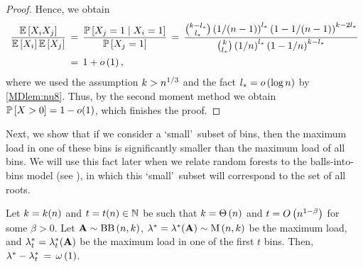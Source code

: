 \begin{proof}
Hence, we obtain
\begin{align*}
	\frac{\mathbb{E}\left[X_i X_j\right]}{\mathbb{E}\left[X_i\right]\mathbb{E}\left[X_j\right]}&\hspace{0.06cm}=\hspace{0.06cm}\frac{\mathbb{P}\left[X_j=1 \;\middle|\; X_i=1\right]}{\mathbb{P}\left[X_j=1\right]}\hspace{0.06cm}=\hspace{0.06cm}\frac{\binom{k-l_\ast}{l_\ast}\left(1/(n-1)\right)^{l_\ast}\left(1-1/(n-1)\right)^{k-2l_\ast}}{\binom{k}{l_\ast}\left(1/n\right)^{l_\ast}\left(1-1/n\right)^{k-l_\ast}} 
	\\
	&\hspace{0.06cm}=\hspace{0.06cm}1+o\left(1\right),
\end{align*}
where we used the assumption $k>n^{1/3}$ and the fact $l_\ast=o\left(\log n\right)$ by \ref{MDlem:nu8}. Thus, by the second moment method we obtain $\mathbb{P}\left[X>0\right]=1-o(1)$, which finishes the proof.
\end{proof}

Next, we show that if we consider a \lq small\rq\ subset of bins, then the maximum load in one of these bins is significantly smaller than the maximum load of all bins. We will use this fact later when we relate random forests to the balls-into-bins model (see ), in which this \lq small\rq\ subset will correspond to the set of all roots.

\begin{lem}\label{MDlem:max_load_subset}
Let $k=k(n)$ and $t=t(n) \in \mathbb{N}$ be such that $k=\Theta\left(n\right)$ and $t= O\left(n^{1-\beta}\right)$ for some $\beta>0$. Let $\mathbf{A}\sim\operatorname{BB}\left(n, k\right)$, $\lambda^\ast=\lambda^\ast(\mathbf{A})\sim \operatorname{M}\left(n, k\right)$ be the maximum load, and $\lambda^\ast_{t}=\lambda^\ast_{t}(\mathbf{A})$ be the maximum load in one of the first $t$ bins. Then, \whp\ $\lambda^\ast-\lambda^\ast_{ t}\hspace{0.06cm}=\hspace{0.06cm}\omega\left(1\right)$.
\end{lem}

